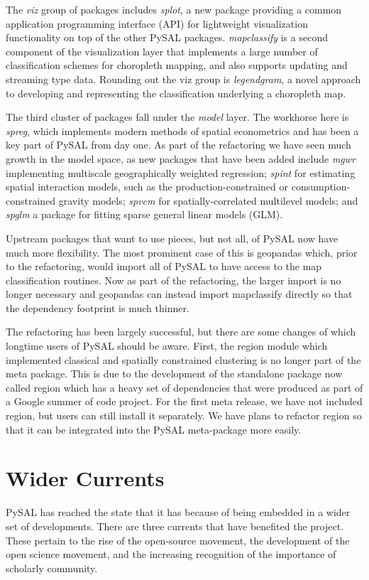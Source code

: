 \documentclass[11pt]{article}
\begin{document}
The \emph{viz} group of packages includes \emph{splot}, a new package providing a
common application programming interface (API) for lightweight visualization
functionality on top of the other PySAL packages. \emph{mapclassify} is a second
component of the visualization layer that implements a large number of
classification schemes for choropleth mapping, and also supports updating and
streaming type data. Rounding out the viz group is \emph{legendgram}, a novel approach
to developing and representing the classification underlying a choropleth
map.

The third cluster of packages fall under the \emph{model} layer. The workhorse here
is \emph{spreg}, which implements modern methods of spatial econometrics and has been a
key part of PySAL from day one. As part of the refactoring we have seen much
growth in the model space, as new packages that have been added include \emph{mgwr}
implementing multiscale geographically weighted regression; \emph{spint} for
estimating spatial interaction models, such as the production-constrained or
consumption-constrained gravity models;  \emph{spvcm} for spatially-correlated
multilevel models; and \emph{spglm} a package for fitting sparse general linear models
(GLM).


Upstream packages that want to use pieces, but not all, of PySAL now have much
more flexibility. The most prominent case of this is geopandas
which, prior to the refactoring, would import all of PySAL to have access to
the map classification routines. Now as part of the refactoring, the larger
import is no longer necessary and geopandas can instead import mapclassify
directly so that the dependency footprint is much thinner.




The refactoring has been largely successful, but there are some changes of which
longtime users of PySAL should be aware. First, the region module which
implemented classical and spatially constrained clustering is no longer part of
the meta package. This is due to the development of the standalone package now
called region which has a heavy set of dependencies that were produced as part
of a Google summer of code project. For the first meta release, we have not
included region, but users can still install it separately. We have plans to
refactor region so that it can be integrated into the PySAL meta-package more
easily.

\section*{Wider Currents}
\label{sec:orgd898bf7}
PySAL has reached the state that it has because of being embedded in a wider set
of developments. There are three currents that have benefited the project. These
pertain to the rise of the open-source movement, the development of the open
science movement, and the increasing recognition of the importance of scholarly
community.
\end{document}
